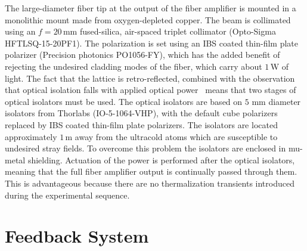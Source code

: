 \documentclass[twocolumn,aps,pra,showpacs,preprintnumbers,bibnotes]{revtex4-1}
\begin{document}
The large-diameter fiber tip at the output of the fiber amplifier is mounted in a monolithic mount made from oxygen-depleted copper.
The beam is collimated using an $f=20\,$mm fused-silica, air-spaced triplet collimator (Opto-Sigma HFTLSQ-15-20PF1).
The polarization is set using an IBS coated thin-film plate polarizer (Precision photonics PO1056-FY), which has the added benefit of rejecting the undesired cladding modes of the fiber, which carry about $1\,$W of light. 
The fact that the lattice is retro-reflected, combined with the observation that optical isolation falls with applied optical power~\cite{Yoshida1999} means that two stages of optical isolators must be used. 
The optical isolators are based on $5$ mm diameter isolators from Thorlabs (IO-5-1064-VHP), with the default cube polarizers replaced by IBS coated thin-film plate polarizers. 
The isolators are located approximately $1\,$m away from the ultracold atoms which are susceptible to  undesired stray fields.
To overcome this problem the isolators are enclosed in mu-metal shielding.
Actuation of the power is performed after the optical isolators, meaning that the full fiber amplifier output is continually passed through them. 
This is advantageous because there are no thermalization transients introduced during the experimental sequence.

\section{Feedback System}
\end{document}
